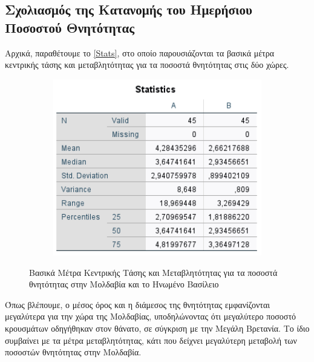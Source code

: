 \documentclass{article}
\begin{document}
\subsection{Σχολιασμός της Κατανομής του Ημερήσιου Ποσοστού Θνητότητας}

    Αρχικά, παραθέτουμε το \autoref{Stats}, στο οποίο παρουσιάζονται τα βασικά μέτρα κεντρικής τάσης και μεταβλητότητας για τα ποσοστά θνητότητας στις δύο χώρες.
    
    \begin{figure}[H]
        \centering
    	\begin{adjustbox}{center}
    		\begin{subfigure}[c]{1\textwidth}    
    			\includegraphics[width=1\textwidth,height=\textheight,keepaspectratio]{media/2/stats.png}
    		\end{subfigure}%
    	\end{adjustbox}
    	\caption{Βασικά Μέτρα Κεντρικής Τάσης και Μεταβλητότητας για τα ποσοστά θνητότητας στην Μολδαβία και το Ηνωμένο Βασίλειο}
        \label{Stats}
    \end{figure}
    
    Όπως βλέπουμε, ο μέσος όρος και η διάμεσος της θνητότητας εμφανίζονται μεγαλύτερα για την χώρα της Μολδαβίας, υποδηλώνοντας ότι μεγαλύτερο ποσοστό κρουσμάτων οδηγήθηκαν στον θάνατο, σε σύγκριση με την Μεγάλη Βρετανία. Το ίδιο συμβαίνει με τα μέτρα μεταβλητότητας, κάτι που δείχνει μεγαλύτερη μεταβολή των ποσοστών θνητότητας στην Μολδαβία.
    
\end{document}
